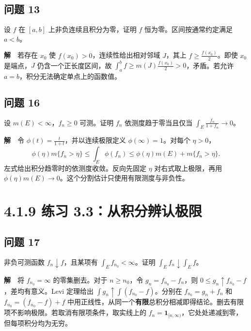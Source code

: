 \documentclass[11pt,a4paper]{article}
\begin{document}
\subsection{问题 13}\label{ux95eeux9898-13}

设 \(f\) 在 \([a,b]\) 上非负连续且积分为零，证明 \(f\)
恒为零。区间按通常约定满足 \(a<b\)。

\textbf{解}　若存在 \(x_0\) 使 \(f(x_0)>0\)，连续性给出相对邻域
\(J\)，其上 \(f\ge \frac{f(x_0)}2\)。即使 \(x_0\) 是端点，\(J\)
仍含一个正长度区间，故
\(\int_a^b f\ge m(J)\frac{f(x_0)}2>0\)，矛盾。若允许
\(a=b\)，积分无法确定单点上的函数值。

\subsection{问题 16}\label{ux95eeux9898-16}

设 \(m(E)<\infty\)，\(f_n\ge0\) 可测。证明 \(f_n\) 依测度趋于零当且仅当
\(\int_E \frac{f_n}{1+f_n}\to0\)。

\textbf{解}　令 \(\phi(t)=\frac{t}{1+t}\)，并以连续极限定义
\(\phi(\infty)=1\)。对每个 \(\eta>0\)， \begin{equation*}
\phi(\eta)m\{f_n>\eta\}\le\int_E\phi(f_n)
\le\phi(\eta)m(E)+m\{f_n>\eta\}.
\end{equation*} 左式给出积分趋零时的依测度收敛。反向先固定 \(\eta\)
对右式取上极限，再用
\(\phi(\eta)m(E)\to0\)。这个分割估计只使用有限测度与非负性。

\clearpage\section[\S{}4.1.9 练习
3.3：从积分辨认极限]{4.1.9 练习
3.3：从积分辨认极限}\label{ux7ec3ux4e60-3.3ux4eceux79efux5206ux8fa8ux8ba4ux6781ux9650}

\subsection{问题 17}\label{ux95eeux9898-17}

非负可测函数 \(f_n\downarrow f\)，且某项有
\(\int_E f_{n_0}<\infty\)。证明 \(\int_E f_n\downarrow\int_E f\)。

\textbf{解}　将 \(f_{n_0}=\infty\) 的零集删去。对于 \(n\ge n_0\)，令
\(g_n=f_{n_0}-f_n\)，则 \(0\le g_n\uparrow f_{n_0}-f\)，差均有意义。Levi
定理给出 \(\int g_n\uparrow\int(f_{n_0}-f)\)。分别在 \(f_{n_0}=g_n+f_n\)
和 \(f_{n_0}=(f_{n_0}-f)+f\)
中用正线性，从同一个\textbf{有限}总积分相减即得结论。删去有限项不影响极限。若取消有限项条件，取实线上的
\(f_n=\mathbf1_{[n,\infty)}\)，它处处递减到零，但每项积分均为无穷。
\end{document}
